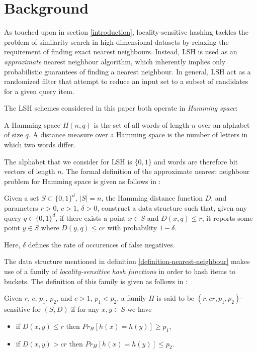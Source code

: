 \section{Background}
\label{background}

As touched upon in section \ref{introduction}, locality-sensitive hashing tackles the problem of similarity search in high-dimensional datasets by relaxing the requirement of finding exact nearest neighbours. Instead, LSH is used as an \textit{approximate} nearest neighbour algorithm, which inherently implies only probabilistic guarantees of finding a nearest neighbour. In general, LSH act as a randomized filter that attempt to reduce an input set to a subset of candidates for a given query item.

The LSH schemes considered in this paper both operate in \textit{Hamming space}:

\begin{definition}
\label{definition-hamming-space}
  A Hamming space $H(n, q)$ is the set of all words of length $n$ over an alphabet of size $q$. A distance measure over a Hamming space is the number of letters in which two words differ.
\end{definition}

The alphabet that we consider for LSH is $\{0, 1\}$ and words are therefore bit vectors of length $n$. The formal definition of the approximate nearest neighbour problem for Hamming space is given as follows in \cite{DBLP:journals/corr/PhamP16}:

\begin{definition}
\label{definition-nearest-neighbour}
  Given a set $S \subset \{0, 1\}^d$, $|S| = n$, the Hamming distance function $D$, and parameters $r > 0$, $c > 1$, $\delta > 0$, construct a data structure such that, given any query $q \in \{0,1\}^d$, if there exists a point $x \in S$ and $D(x, q) \leq r$, it reports some point $y \in S$ where $D(y, q) \leq cr$ with probability $1 - \delta$.
\end{definition}

Here, $\delta$ defines the rate of occurences of false negatives.

The data structure mentioned in definition \ref{definition-nearest-neighbour} makes use of a family of \textit{locality-sensitive hash functions} in order to hash items to buckets. The definition of this family is given as follows in \cite{DBLP:conf/stoc/IndykM98}:

\begin{definition}
\label{definition-hash-functions}
  Given $r$, $c$, $p_1$, $p_2$, and $c > 1$, $p_1 < p_2$, a family $H$ is said to be $(r, cr, p_1, p_2)$-sensitive for $(S, D)$ if for any $x, y \in S$ we have

  \begin{itemize}
    \item if $D(x, y) \leq r$ then $Pr_H [h(x) = h(y)] \geq p_1$,
    \item if $D(x, y) > cr$ then $Pr_H [h(x) = h(y)] \leq p_2$.
  \end{itemize}
\end{definition}

